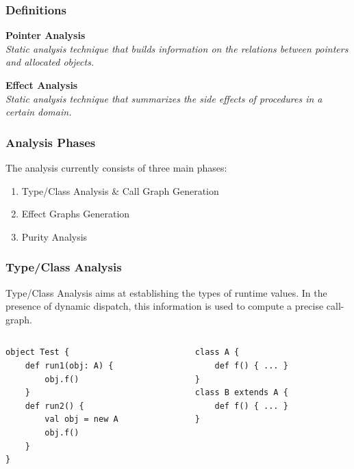 \documentclass[hyperref={pdfpagelabels=false}]{beamer}
\begin{document}
\begin{frame}
\frametitle{Definitions}
    \textbf{Pointer Analysis}\\
    \emph{Static analysis technique that builds information on the
relations between pointers and allocated objects.}

    \vspace{30pt}

    \textbf{Effect Analysis}\\
    \emph{Static analysis technique that summarizes the side effects
of procedures in a certain domain.}
\end{frame}

\begin{frame}
    \frametitle{Analysis Phases}
    The analysis currently consists of three main phases:
    \begin{enumerate}
        \item Type/Class Analysis \& Call Graph Generation
        \item Effect Graphs Generation
        \item Purity Analysis
\end{enumerate}

\end{frame}

\begin{frame}[fragile]
\frametitle{Type/Class Analysis}

    Type/Class Analysis aims at establishing the types of runtime values. In
    the presence of dynamic dispatch, this information is used to compute a
    precise call-graph.

    \begin{columns}
      \begin{column}{0.5\textwidth}
\begin{lstlisting}
object Test {
    def run1(obj: A) {
        obj.f()
    }
    def run2() {
        val obj = new A
        obj.f()
    }
}
\end{lstlisting}
      \end{column}
      \begin{column}{0.5\textwidth}
\begin{lstlisting}
class A {
    def f() { ... }
}
class B extends A {
    def f() { ... }
}
\end{lstlisting}
      \end{column}
    \end{columns}


\end{frame}
\end{document}
